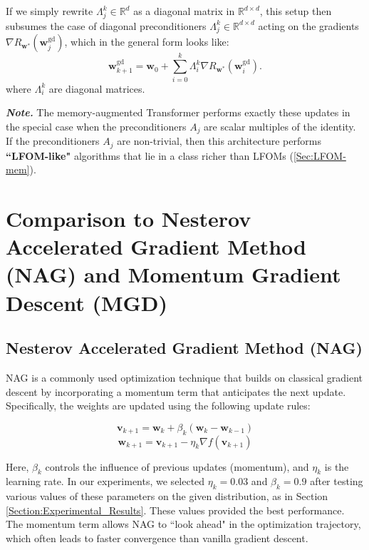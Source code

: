 \documentclass[11pt]{article}
\numberwithin{equation}{section}
\begin{document}
If we simply rewrite \(\Lambda_j^k \in \mathbb R^{d}\) as a diagonal matrix in \(\mathbb R^{d \times d}\), this setup then subsumes the case of diagonal preconditioners \(\Lambda_j^k \in \mathbb R^{d \times d}\) acting on the gradients \( \nabla R_{\mathbf{w}^*}(\mathbf{w}_j^{\mathrm{gd}}) \), which in the general form looks like:
    \begin{equation}
    \mathbf{w}_{k+1}^{\mathrm{gd}} = \mathbf{w}_0 + \sum_{i=0}^k \Lambda_i^k \nabla R_{\mathbf{w}^*}(\mathbf{w}_i^{\mathrm{gd}}).
    \end{equation}
where \(\Lambda_i^k\) are diagonal matrices.

\textbf{\textit{Note.}} The memory-augmented Transformer performs exactly these updates in the special case when the preconditioners \(A_j\) are scalar multiples of the identity. If the preconditioners \(A_j\) are non-trivial, then this architecture performs \textbf{``LFOM-like"} algorithms that lie in a class richer than LFOMs (\ref{Sec:LFOM-mem}). 

\section{Comparison to Nesterov Accelerated Gradient Method (NAG) and Momentum Gradient Descent (MGD)}

\subsection{Nesterov Accelerated Gradient Method (NAG)}

NAG is a commonly used optimization technique that builds on classical gradient descent by incorporating a momentum term that anticipates the next update. Specifically, the weights are updated using the following update rules:

\[
\mathbf{v}_{k+1} = \mathbf{w}_k + \beta_k (\mathbf{w}_k - \mathbf{w}_{k-1})
\]
\[
\mathbf{w}_{k+1} = \mathbf{v}_{k+1} - \eta_k \nabla f(\mathbf{v}_{k+1})
\]

Here, \( \beta_k \) controls the influence of previous updates (momentum), and \( \eta_k \) is the learning rate. In our experiments, we selected \( \eta_k = 0.03 \) and \( \beta_k = 0.9 \) after testing various values of these parameters on the given distribution, as in Section \ref{Section:Experimental_Results}. These values provided the best performance. The momentum term allows NAG to ``look ahead" in the optimization trajectory, which often leads to faster convergence than vanilla gradient descent.
\end{document}
